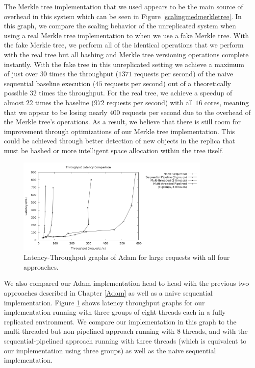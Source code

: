 \documentclass[11pt, oneside]{report}
\begin{document}
The Merkle tree implementation that we used appears to be the main source of overhead in this system which can be seen in Figure \ref{scalingmedmerkletree}. 
In this graph, we compare the scaling behavior of the unreplicated system when using a real Merkle tree implementation to when we use a fake Merkle tree.
With the fake Merkle tree, we perform all of the identical operations that we perform with the real tree but all hashing and Merkle tree versioning operations complete instantly.
With the fake tree in this unreplicated setting we achieve a maximum of just over $30$ times the throughput ($1371$ requests per second) of the naive sequential baseline execution ($45$ requests per second) out of a theoretically possible $32$ times the throughput.
For the real tree, we achieve a speedup of almost $22$ times the baseline ($972$ requests per second) with all $16$ cores, meaning that we appear to be losing nearly $400$ requests per second due to the overhead of the Merkle tree's operations.
As a result, we believe that there is still room for improvement through optimizations of our Merkle tree implementation.
This could be achieved through better detection of new objects in the replica that must be hashed or more intelligent space allocation within the tree itself.

\begin{figure}[h]
\centering
\includegraphics[width=0.85\textwidth]{graphs/latencythroughput/graph.png}
\caption{\label{head2head}Latency-Throughput graphs of Adam for large requests with all four approaches.}
\end{figure}

We also compared our Adam implementation head to head with the previous two approaches described in Chapter \ref{Adam} as well as a naive sequential implementation. 
Figure \ref{head2head} shows latency throughput graphs for our implementation running with three groups of eight threads each in a fully replicated environment. 
We compare our implementation in this graph to the multi-threaded but non-pipelined approach running with 8 threads, and with the sequential-pipelined approach running with three threads (which is equivalent to our implementation using three groups) as well as the naive sequential implementation. 
\end{document}
